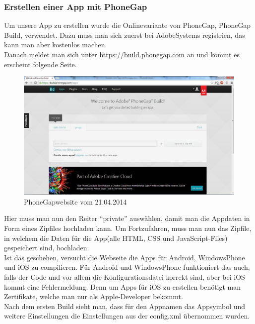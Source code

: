 \subsubsection{Erstellen einer App mit PhoneGap}
Um unsere App zu erstellen wurde die Onlinevariante von PhoneGap, PhoneGap Build, verwendet. Dazu muss man sich zuerst bei AdobeSystems registrien, das kann man aber kostenlos machen.\\
Danach meldet man sich unter \href{https://build.phonegap.com}{https://build.phonegap.com} an und kommt es erscheint folgende Seite.\\

\begin{figure}[H]
\includegraphics[keepaspectratio=true, width=14cm]{images/phoneGap/PhoneGap1.png}
\caption{PhoneGapwebsite vom 21.04.2014}
\end{figure}

Hier muss man nun den Reiter \enquote{private} auswählen, damit man die Appdaten in Form eines Zipfiles hochladen kann.
Um Fortzufahren, muss man nun das Zipfile, in welchem die Daten für die App(alle HTML, CSS und JavaScript-Files) gespeichert sind, hochladen.\\
Ist das geschehen, versucht die Webseite die Apps für Android, WindowsPhone und iOS zu compilieren. Für Android und WindowsPhone funktioniert das auch, falls der Code und vor allem die Konfigurationsdatei korrekt sind, aber bei iOS kommt eine Fehlermeldung. Denn um Apps für iOS zu erstellen benötigt man Zertifikate, welche man nur als Apple-Developer bekommt.\\
Nach dem ersten Build sieht man, dass für den Appnamen das Appsymbol und weitere Einstellungen die Einstellungen aus der config.xml übernommen wurden.\\

